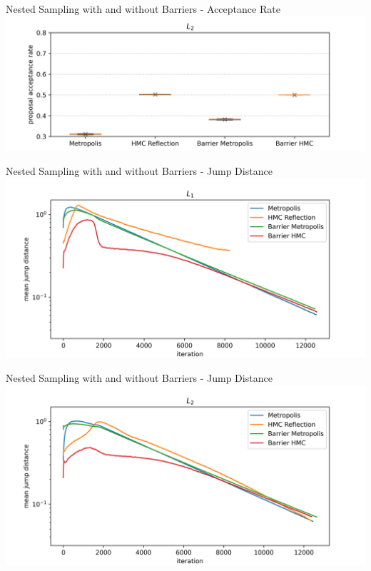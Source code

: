 \documentclass[]{beamer}
\begin{document}
  \begin{frame}{Nested Sampling with and without Barriers - Acceptance Rate}
    \centering
    \includegraphics[trim={1cm, 0cm, 1.8cm, 0cm}, clip, scale=0.6]{figs/results/acceptance_rates_spike_offcenter_20d.png}
  \end{frame}
  \begin{frame}{Nested Sampling with and without Barriers - Jump Distance}
    \centering
    \includegraphics[trim={1cm, 0cm, 1.8cm, 0cm}, clip, scale=0.6]{figs/results/mean_jump_distances_spike_20d.png}
  \end{frame}
  \begin{frame}{Nested Sampling with and without Barriers - Jump Distance}
    \centering
    \includegraphics[trim={1cm, 0cm, 1.8cm, 0cm}, clip, scale=0.6]{figs/results/mean_jump_distances_spike_offcenter_20d.png}
  \end{frame}
\end{document}
